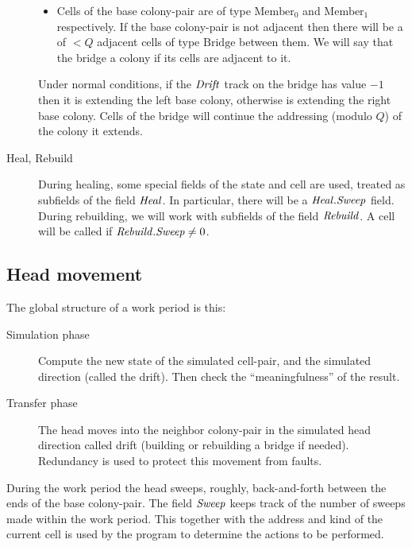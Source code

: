 \documentclass[11pt]{memoir}
\theoremstyle{definition} %
\newcommand{\fld}[1]{\ensuremath{\textit{#1\/}}}
\newcommand{\Q}{Q} %
\newcommand{\Drift}{\fld{Drift}}
\newcommand{\Heal}{\fld{Heal}} %
\newcommand{\Rebuild}{\fld{Rebuild}} %
\newcommand{\Sweep}{\fld{Sweep}} %
\newcommand{\Bridge}{\mathrm{Bridge}}
\newcommand{\Member}{\mathrm{Member}}
\begin{document}
\begin{description}
\begin{itemize}
\item 
Cells of the base colony-pair are of type \( \Member_{0} \) and \( \Member_{1} \) respectively.
If the base colony-pair is not adjacent then there will be a  of \( <\Q \)
adjacent cells of type \( \Bridge \) between them.
We will say that the bridge  a colony if its cells are adjacent to it.  
\end{itemize}
Under normal conditions,  
if the \( \Drift \) track on the bridge has value \( -1 \) then it is extending the left base
colony, otherwise is extending the right base colony.
Cells of the bridge will continue the addressing (modulo \( \Q \)) of the colony it extends.

\item[Heal, Rebuild] During healing, some special fields of the state and cell are used,
  treated as subfields of the field \( \Heal \).
In particular, there will be a \( \Heal.\Sweep \) field.
During rebuilding, we will work with subfields of the field \( \Rebuild \).
A cell will be called  if \( \Rebuild.\Sweep\ne 0 \).

\end{description}

\subsection{Head movement}\label{sec:sweep}

The global structure of a work period is this:
\begin{description}

\item[Simulation phase]
Compute the new state of the simulated cell-pair, and the simulated direction (called the drift).
Then check the ``meaningfulness'' of the result.

\item[Transfer phase]
  The head moves into the neighbor colony-pair
  in the simulated head direction called drift (building or rebuilding
  a bridge if needed).
  Redundancy is used to protect this movement from faults.
\end{description}

During the work period the head sweeps, roughly, back-and-forth between
the ends of the base colony-pair.
The field \( \Sweep \) keeps track of the number of sweeps made within the work period.
This together with the address and kind of the current cell is used by the program to determine
the actions to be performed.
\end{document}
